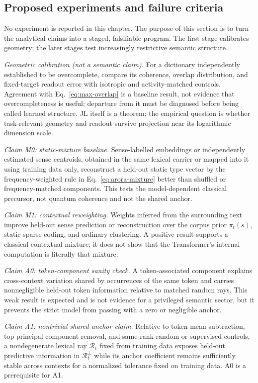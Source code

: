 \documentclass[
  aps,
  reprint,
  superscriptaddress,
  floatfix,
  nofootinbib,
  longbibliography
]{revtex4-2}
\begin{document}
\subsection{Proposed experiments and failure criteria}
\label{sec:predictions}

No experiment is reported in this chapter.  The purpose of this section is to
turn the analytical claims into a staged, falsifiable program.  The first
stage calibrates geometry; the later stages test increasingly restrictive
semantic structure.

\emph{Geometric calibration (not a semantic claim).}
For a dictionary independently established to be overcomplete, compare its
coherence, overlap distribution, and fixed-target readout error with isotropic
and activity-matched controls.  Agreement with Eq.~\eqref{eq:max-overlap} is a
baseline result, not evidence that overcompleteness is useful; departure from
it must be diagnosed before being called learned structure.  JL itself is a
theorem; the empirical question is whether task-relevant geometry and readout
survive projection near its logarithmic dimension scale.

\emph{Claim M0: static-mixture baseline.}
Sense-labelled embeddings or independently estimated sense centroids, obtained
in the same lexical carrier or mapped into it using training data only,
reconstruct a held-out static type vector by the frequency-weighted rule in
Eq.~\eqref{eq:arora-mixture} better than shuffled or frequency-matched
components.  This tests the model-dependent classical precursor, not quantum
coherence and not the shared anchor.

\emph{Claim M1: contextual reweighting.}
Weights inferred from the surrounding text improve held-out sense prediction
or reconstruction over the corpus prior $\pi_t(s)$, static sparse coding, and
ordinary clustering.  A positive result supports a classical contextual
mixture; it does not show that the Transformer's internal computation is
literally that mixture.

\emph{Claim A0: token-component sanity check.}
A token-associated component explains cross-context variation shared by
occurrences of the same token and carries nonnegligible held-out token
information relative to matched random rays.  This weak result is expected and
is not evidence for a privileged semantic sector, but it prevents the strict
model from passing with a zero or negligible anchor.

\emph{Claim A1: nontrivial shared-anchor claim.}
Relative to token-mean subtraction, top-principal-component removal, and
same-rank random or supervised controls, a nondegenerate lexical ray
$\mathcal R_t$ fixed from training data exposes held-out predictive information
in $\mathcal R_t^\perp$ while its anchor coefficient remains sufficiently
stable across contexts for a normalized tolerance fixed on training data.  A0
is a prerequisite for A1.
\end{document}
